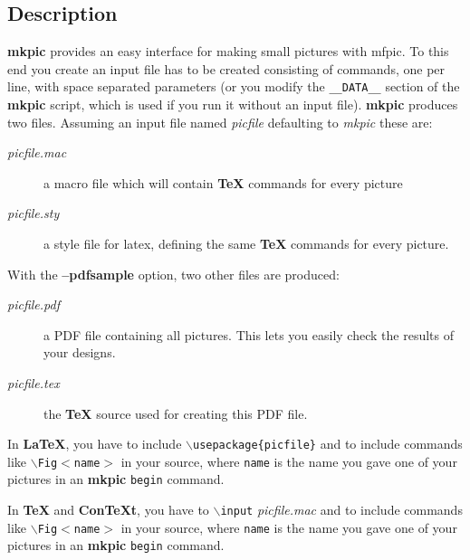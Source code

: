\documentclass[a4paper,twocolumn]{article}
\begin{document}
\subsection{Description\label{DESCRIPTION}}

\textbf{mkpic} provides an easy interface for making small pictures with
mfpic. To this end you create an input file has to be created consisting
of commands, one per line, with space separated parameters (or you modify the
\texttt{\_\_DATA\_\_} section of the \textbf{mkpic} script, which is used if you run it
without an input file). \textbf{mkpic} produces two files. Assuming an input
file named \emph{picfile} defaulting to \emph{mkpic} these are:

\begin{description}

\item[{\emph{picfile.mac}}] 

a macro file which will contain \textbf{TeX} commands for every picture

\item[{\emph{picfile.sty}}] 

a style file for latex, defining the same \textbf{TeX} commands for every picture.

\end{description}

With the \textbf{--pdfsample} option, two other files are produced:

\begin{description}

\item[{\emph{picfile.pdf}}] 

a PDF file containing all pictures. 
This lets you easily check the results of your designs.

\item[{\emph{picfile.tex}}] 

the \textbf{TeX} source used for creating this PDF file.

\end{description}

In \textbf{LaTeX}, you have to include \texttt{$\backslash$usepackage\{picfile\}} and to include
commands like \texttt{$\backslash$Fig$<$name$>$} in your source, where \texttt{name} is the
name you gave one of your pictures in an \textbf{mkpic} \texttt{begin} command.

In \textbf{TeX} and \textbf{ConTeXt}, you have to \texttt{$\backslash$input} \emph{picfile.mac} and to
include commands like \texttt{$\backslash$Fig$<$name$>$} in your source, where \texttt{name} is
the name you gave one of your pictures in an \textbf{mkpic} \texttt{begin} command.
\end{document}
